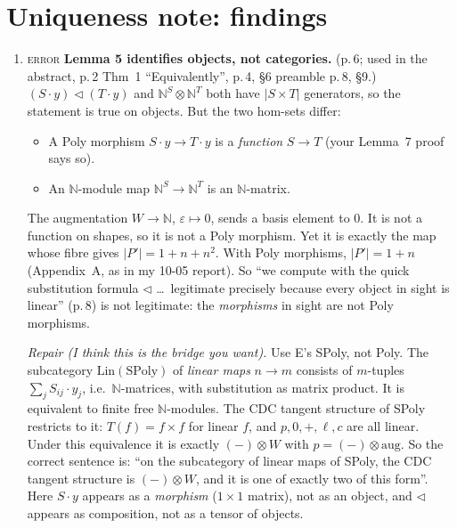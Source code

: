 \documentclass[11pt]{article}
\newcommand{\tri}{\mathbin{\triangleleft}}
\newcommand{\N}{\mathbb{N}}
\newcommand{\iss}[1]{\textsc{#1}}
\begin{document}
\section{Uniqueness note: findings}
\begin{enumerate}[label=\textbf{U\arabic*.},leftmargin=*]
\item \iss{error} \textbf{Lemma 5 identifies objects, not categories.} (p.\,6; used in the abstract,
p.\,2 Thm~1 ``Equivalently'', p.\,4, \S6 preamble p.\,8, \S9.) $(S\cdot y)\tri(T\cdot y)$ and
$\N^S\otimes\N^T$ both have $|S\times T|$ generators, so the statement is true on objects. But the
two hom-sets differ:
\begin{itemize}[leftmargin=1.2em]
\item A Poly morphism $S\cdot y\to T\cdot y$ is a \emph{function} $S\to T$ (your Lemma~7 proof says
so).
\item An $\N$-module map $\N^S\to\N^T$ is an $\N$-matrix.
\end{itemize}
The augmentation $W\to\N$, $\varepsilon\mapsto0$, sends a basis element to $0$. It is not a function
on shapes, so it is not a Poly morphism. Yet it is exactly the map whose fibre gives $|P'|=1+n+n^2$.
With Poly morphisms, $|P'|=1+n$ (Appendix~A, as in my 10-05 report). So ``we compute with the quick
substitution formula $\tri$ \dots\ legitimate precisely because every object in sight is linear''
(p.\,8) is not legitimate: the \emph{morphisms} in sight are not Poly morphisms.

\emph{Repair (I think this is the bridge you want).} Use E's SPoly, not Poly. The subcategory
$\mathrm{Lin}(\mathrm{SPoly})$ of \emph{linear maps} $n\to m$ consists of $m$-tuples
$\sum_j S_{ij}\cdot y_j$, i.e.\ $\N$-matrices, with substitution as matrix product. It is
equivalent to finite free $\N$-modules. The CDC tangent structure of SPoly restricts to it:
$T(f)=f\times f$ for linear $f$, and $p,0,+,\ell,c$ are all linear. Under this equivalence it is
exactly $(-)\otimes W$ with $p=(-)\otimes\mathrm{aug}$. So the correct sentence is: ``on the
subcategory of linear maps of SPoly, the CDC tangent structure is $(-)\otimes W$, and it is one of
exactly two of this form''. Here $S\cdot y$ appears as a \emph{morphism} ($1\times1$ matrix), not as
an object, and $\tri$ appears as composition, not as a tensor of objects.


\end{enumerate}
\end{document}
